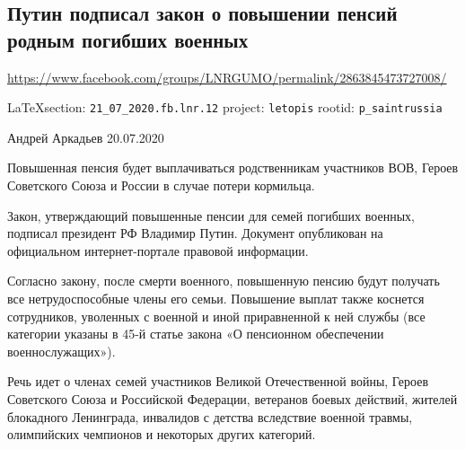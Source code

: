  
 
\subsection{Путин подписал закон о повышении пенсий родным погибших военных}
\label{sec:21_07_2020.fb.lnr.12}
\url{https://www.facebook.com/groups/LNRGUMO/permalink/2863845473727008/}
  
\vspace{0.5cm}
{\small\LaTeX section: \verb|21_07_2020.fb.lnr.12| project: \verb|letopis| rootid: \verb|p_saintrussia|}
\vspace{0.5cm}

Андрей Аркадьев
20.07.2020

Повышенная пенсия будет выплачиваться родственникам участников ВОВ, Героев
Советского Союза и России в случае потери кормильца.

Закон, утверждающий повышенные пенсии для семей погибших военных, подписал
президент РФ Владимир Путин. Документ опубликован на официальном
интернет-портале правовой информации.

Согласно закону, после смерти военного, повышенную пенсию будут получать все
нетрудоспособные члены его семьи.  Повышение выплат также коснется сотрудников,
уволенных с военной и иной приравненной к ней службы (все категории указаны в
45-й статье закона «О пенсионном обеспечении военнослужащих»).

Речь идет о членах семей участников Великой Отечественной войны, Героев
Советского Союза и Российской Федерации, ветеранов боевых действий, жителей
блокадного Ленинграда, инвалидов с детства вследствие военной травмы,
олимпийских чемпионов и некоторых других категорий.
  
